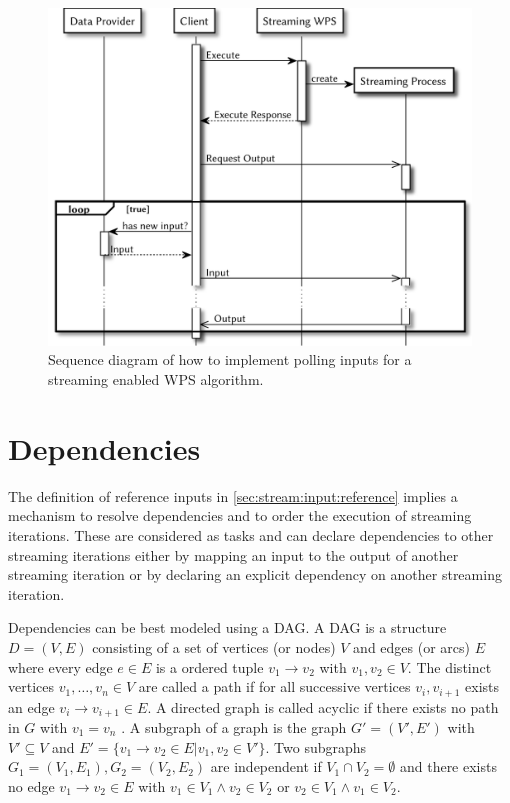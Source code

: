     \begin{figure}[!htb]
      \centering
      \includegraphics[width = 0.73521126760563382\linewidth]{figures/sequence-diagram-polling.pdf}
      \caption{\label{fig:sd:polling}Sequence diagram of how to implement polling inputs for a streaming enabled WPS algorithm.}
    \end{figure}

\section{Dependencies}
  \label{sec:stream:dependencies}
  The definition of reference inputs in \cref{sec:stream:input:reference} implies a mechanism to resolve dependencies and to order the execution of streaming iterations. These are considered as tasks and can declare dependencies to other streaming iterations either by mapping an input to the output of another streaming iteration or by declaring an explicit dependency on another streaming iteration.

  Dependencies can be best modeled using a \ac{DAG}. A \ac{DAG} is a structure $D=(V, E)$ consisting of a set of vertices (or nodes) $V$ and edges (or arcs) $E$ where every edge $e\in E$ is a ordered tuple $v_1 \rightarrow v_2$ with $v_1, v_2 \in V$. The distinct vertices $v_1,\dots,v_n\in V$ are called a path if for all successive vertices $v_i, v_{i+1}$ exists an edge $v_i \rightarrow v_{i+1} \in E$. A directed graph is called acyclic if there exists no path in $G$ with $v_1 = v_n$ \citep{jungnickel2012graphs}. A subgraph of a graph is the graph $G' = (V', E')$ with $V'\subseteq V$ and $E' = \{v_1 \rightarrow v_2 \in E | v_1, v_2\in V'\}$. Two subgraphs $G_1 = (V_1, E_1), G_2 = (V_2, E_2)$ are independent if $V_1 \cap V_2 = \emptyset$ and there exists no edge $v_1\rightarrow v_2\in E$ with $v_1\in V_1 \wedge v_2\in V_2$ or $v_2\in V_1 \wedge v_1\in V_2$.

